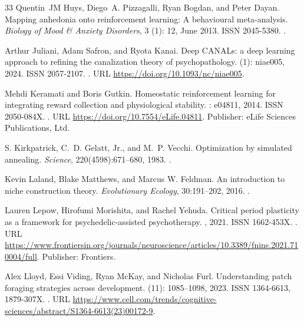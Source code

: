 \documentclass[12pt,fleqn]{article}
\begin{document}
\begin{thebibliography}{33}
  Quentin~JM Huys, Diego~A. Pizzagalli, Ryan Bogdan, and Peter Dayan.
  \newblock Mapping anhedonia onto reinforcement learning: A behavioural
  meta-analysis.
  \newblock \emph{Biology of Mood \& Anxiety Disorders}, 3 (1):
  12, June 2013.
  \newblock ISSN 2045-5380.
  \newblock {}.

  Arthur Juliani, Adam Safron, and Ryota Kanai.
  \newblock Deep {CANALs}: a deep learning approach to refining the canalization
  theory of psychopathology.
   (1): niae005, 2024.
  \newblock ISSN 2057-2107.
  \newblock {}.
  \newblock URL \url{https://doi.org/10.1093/nc/niae005}.

  Mehdi Keramati and Boris Gutkin.
  \newblock Homeostatic reinforcement learning for integrating reward collection
  and physiological stability.
  : e04811, 2014.
  \newblock ISSN 2050-084X.
  \newblock {}.
  \newblock URL \url{https://doi.org/10.7554/eLife.04811}.
  \newblock Publisher: {eLife} Sciences Publications, Ltd.

  S. Kirkpatrick, C.~D. Gelatt, Jr., and M.~P. Vecchi.
  \newblock Optimization by simulated annealing.
  \newblock \emph{Science}, 220(4598):671--680, 1983.
  \newblock {}.

  Kevin Laland, Blake Matthews, and Marcus W. Feldman.
  \newblock An introduction to niche construction theory.
  \newblock \emph{Evolutionary Ecology}, 30:191--202, 2016.
  \newblock {}.

  Lauren Lepow, Hirofumi Morishita, and Rachel Yehuda.
  \newblock Critical period plasticity as a framework for psychedelic-assisted
  psychotherapy.
  , 2021.
  \newblock ISSN 1662-453X.
  \newblock {}.
  \newblock URL
  \url{https://www.frontiersin.org/journals/neuroscience/articles/10.3389/fnins.2021.710004/full}.
  \newblock Publisher: Frontiers.

  Alex Lloyd, Essi Viding, Ryan McKay, and Nicholas Furl.
  \newblock Understanding patch foraging strategies across development.
   (11): 1085--1098, 2023.
  \newblock ISSN 1364-6613, 1879-307X.
  \newblock {}.
  \newblock URL
  \url{https://www.cell.com/trends/cognitive-sciences/abstract/S1364-6613(23)00172-9}.


\end{thebibliography}
\end{document}

